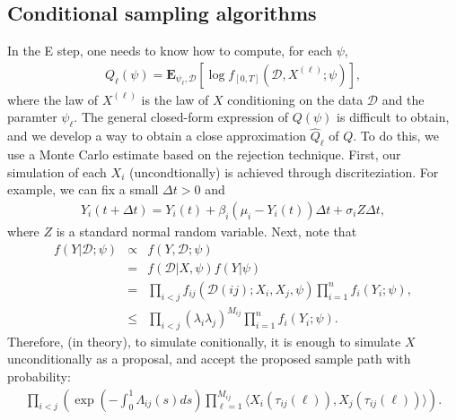 \documentclass[12pt]{article}%
\begin{document}
\subsection{Conditional sampling algorithms}
In the E step, one needs to know how to compute, for each $\psi$,
\begin{eqnarray}
Q_\ell(\psi) = \mathbf E_{\psi_\ell,\mathcal D}\left[ \log f_{[0,T]}(\mathcal D, X^{(\ell)};\psi)\right],
\end{eqnarray}
where the law of $X^{(\ell)}$ is the law of $X$ conditioning on the data $\mathcal D$ and the paramter $\psi_\ell$.  
The general closed-form expression of $Q(\psi)$ is difficult to obtain, 
and we develop a way to obtain a close approximation $\widehat{Q}_\ell$ of $Q$.  
To do this, we use a Monte Carlo estimate based on the rejection technique. 
 First, our simulation of each $X_i$ (uncondtionally) is achieved through discriteziation.  
For example, we can fix a small $\Delta t > 0$ and 
\begin{eqnarray}
Y_i(t+\Delta t) = Y_i(t) + \beta_i(\mu_i - Y_i(t)) \Delta t + \sigma_i  Z \Delta t,
\end{eqnarray}
where $Z$ is a standard normal random variable.  
Next, note that 
\begin{eqnarray}
f(Y\left|\mathcal D\right.;\psi) 
&\propto& f(Y,\mathcal D;\psi) \\
&=& f(\mathcal D\left|X,\psi\right.) f(Y\left|\psi\right.)\\
&=& \prod_{i<j} f_{ij}(\mathcal D(ij);X_i,X_j,\psi) \prod_{i=1}^n f_{i}(Y_i;\psi),\\
&\le & \prod_{i<j} (\lambda_i \lambda_j)^{M_{ij}} \prod_{i=1}^n f_{i}(Y_i;\psi).
\end{eqnarray}
Therefore, (in theory), to simulate conitionally, it is enough to simulate 
$X$ unconditionally as a proposal, and accept the proposed sample path
with probability:
\begin{eqnarray}
\prod_{i<j} \left(
\exp\left(-\int_{0}^{1} \Lambda_{ij}(s) ds\right)
\prod_{\ell=1}^{M_{ij}}\langle X_i(\tau_{ij}(\ell)),X_j(\tau_{ij}(\ell))\rangle\right)
. 
\end{eqnarray}
\end{document}

